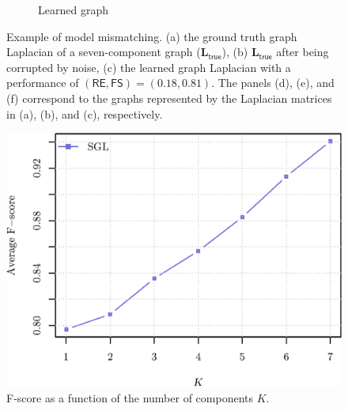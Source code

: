 \begin{figure}[!htb]
\begin{subfigure}[b]{0.3\textwidth}
        \caption{Learned graph}
    \end{subfigure}
        \caption{Example of model mismatching. (a) the ground truth graph Laplacian of a seven-component graph
                 ($\mathbf{L}_{\mathsf{true}}$), (b) $\mathbf{L}_{\mathsf{true}}$ after being corrupted by noise,
                 (c) the learned graph Laplacian with a performance of
                 $(\mathsf{RE}, \mathsf{FS}) = (0.18, 0.81)$.
                 The panels (d), (e), and (f) correspond to the graphs represented by the Laplacian matrices in
                 (a), (b), and (c), respectively.}
        \label{fig:7-comp-graph}
\end{figure}

\begin{figure}[!htb]
  \centering
  \includegraphics[width=.45\textwidth]{model-mismatch/latex/figures/fscore.eps}
  \caption{F-score as a function of the number of components $K$.}
  \label{fig:fscore-k}
\end{figure}

